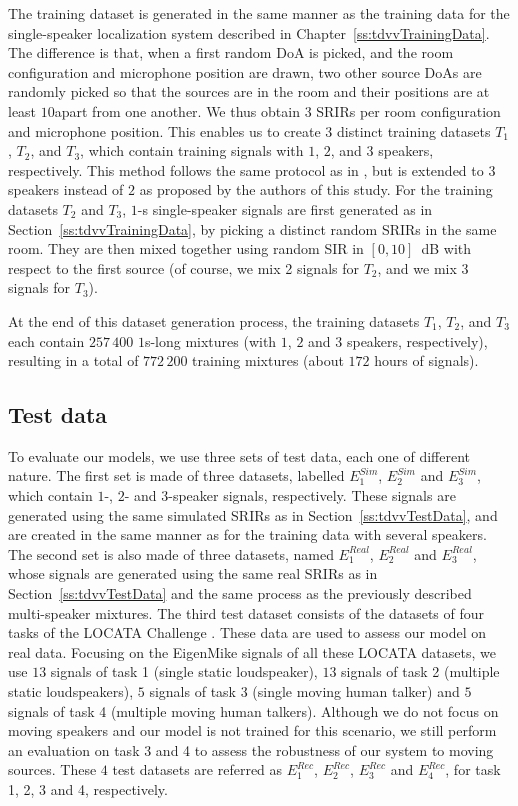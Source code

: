 The training dataset is generated in the same manner as the training data for the single-speaker localization system described in Chapter~\ref{ss:tdvvTrainingData}. The difference is that, when a first random DoA is picked, and the room configuration and microphone position are drawn, two other source DoAs are randomly picked so that the sources are in the room and their positions are at least $10$\textdegree apart from one another. We thus obtain $3$ SRIRs per room configuration and microphone position. This enables us to create $3$ distinct training datasets $T_1$, $T_2$, and $T_3$, which contain training signals with $1$, $2$, and $3$ speakers, respectively. This method follows the same protocol as in \cite{perotin_crnn-based_2019}, but is extended to $3$ speakers instead of $2$ as proposed by the authors of this study. For the training datasets $T_2$ and $T_3$, $1$-s single-speaker signals are first generated as in Section~\ref{ss:tdvvTrainingData}, by picking a distinct random SRIRs in the same room. They are then mixed together using random SIR in $[0,10]$~dB with respect to the first source (of course, we mix 2 signals for $T_2$, and we mix 3 signals for $T_3$).

At the end of this dataset generation process, the training datasets $T_1$, $T_2$, and $T_3$ each contain $257\,400$ $1$s-long mixtures (with $1$, $2$ and $3$ speakers, respectively), resulting in a total of $772\,200$ training mixtures (about $172$ hours of signals).

\subsection{Test data}

To evaluate our models, we use three sets of test data, each one of different nature. The first set is made of three datasets, labelled $E^{Sim}_1$, $E^{Sim}_2$ and $E^{Sim}_3$, which contain $1$-, $2$- and $3$-speaker signals, respectively. These signals are generated using the same simulated SRIRs as in Section~\ref{ss:tdvvTestData}, and are created in the same manner as for the training data with several speakers. The second set is also made of three datasets, named $E^{Real}_1$, $E^{Real}_2$ and $E^{Real}_3$, whose signals are generated using the same real SRIRs as in Section~\ref{ss:tdvvTestData} and the same process as the previously described multi-speaker mixtures. The third test dataset consists of the datasets of four tasks of the LOCATA Challenge \cite{evers_locata_2020}. These data are used to assess our model on real data. Focusing on the EigenMike signals of all these LOCATA datasets, we use $13$ signals of task 1 (single static loudspeaker), $13$ signals of task 2 (multiple static loudspeakers), $5$ signals of task 3 (single moving human talker) and $5$ signals of task 4 (multiple moving human talkers). Although we do not focus on moving speakers and our model is not trained for this scenario, we still perform an evaluation on task 3 and 4 to assess the robustness of our system to moving sources. These $4$ test datasets are referred as $E^{Rec}_1$, $E^{Rec}_2$, $E^{Rec}_3$ and $E^{Rec}_4$, for task 1, 2, 3 and 4, respectively.

